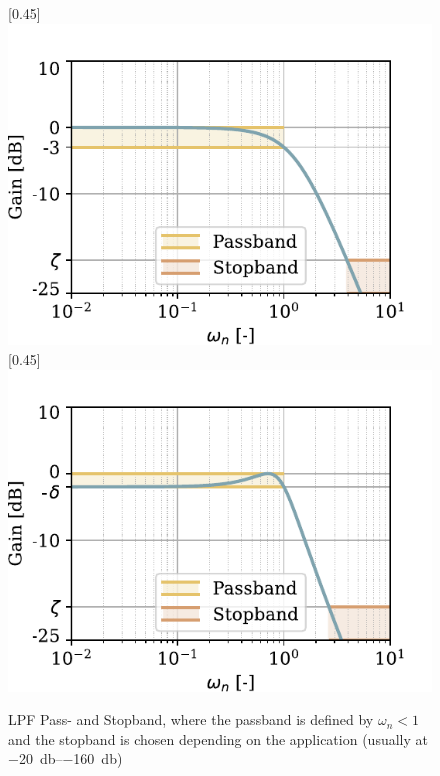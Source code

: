 \begin{figure}[!htb]
    \centering
    [0.45\textwidth]{%
        \includegraphics[scale=0.72]{figures/electronics/lowpass/lp_filter_2ord_bessel_bp}}
    \hfill
    [0.45\textwidth]{%
        \includegraphics[scale=0.72]{figures/electronics/lowpass/lp_filter_2ord_cheby_bp}}
    \caption[\ac{LPF} Pass- and Stopband]{\ac{LPF} Pass- and Stopband, where the passband is defined by $\omega_n<1$ and the stopband is chosen depending on the application (usually at \SIrange{-20}{-160}{\decibel})}
    \label{fig:lp_lowpass_pass_stopband}
\end{figure}


